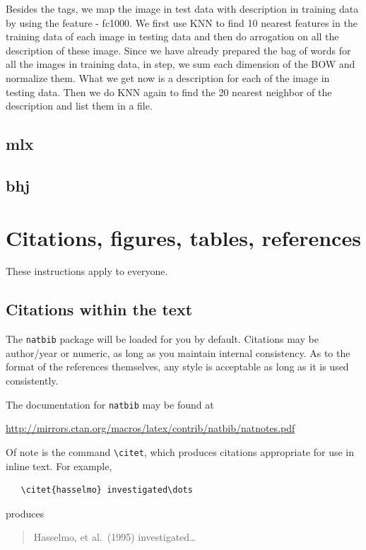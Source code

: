 \documentclass{article}
\begin{document}
Besides the tags, we map the image in test data with description in training data by using the feature - fc1000. We first use KNN to find 10 nearest features in the training data of each image in testing data and then  do arrogation on all the description of these image. Since we have already prepared the bag of words for all the images in training data, in step, we sum each dimension of the BOW and normalize them. What we get now is a description for each of the image in testing data. Then we do KNN again to find the 20 nearest neighbor of the description and list them in a file.

\subsection{mlx}


\subsection{bhj}


\section{Citations, figures, tables, references}
\label{others}

These instructions apply to everyone.

\subsection{Citations within the text}

The \verb+natbib+ package will be loaded for you by default.
Citations may be author/year or numeric, as long as you maintain
internal consistency.  As to the format of the references themselves,
any style is acceptable as long as it is used consistently.

The documentation for \verb+natbib+ may be found at
\begin{center}
  \url{http://mirrors.ctan.org/macros/latex/contrib/natbib/natnotes.pdf}
\end{center}
Of note is the command \verb+\citet+, which produces citations
appropriate for use in inline text.  For example,
\begin{verbatim}
   \citet{hasselmo} investigated\dots
\end{verbatim}
produces
\begin{quote}
  Hasselmo, et al.\ (1995) investigated\dots
\end{quote}
\end{document}
